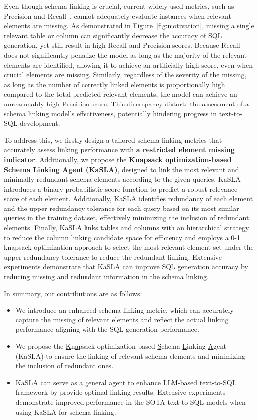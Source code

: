 Even though schema linking is crucial, current widely used metrics, such as Precision and Recall~\citep{li2023resdsql,li2024codes,qu2024before}, cannot adequately evaluate instances when relevant elements are missing. As demonstrated in Figure~\ref{fig:motivation}, missing a single relevant table or column can significantly decrease the accuracy of SQL generation, yet still result in high Recall and Precision scores. Because Recall does not significantly penalize the model as long as the majority of the relevant elements are identified, allowing it to achieve an artificially high score, even when crucial elements are missing.
Similarly, regardless of the severity of the missing, as long as the number of correctly linked elements is proportionally high compared to the total predicted relevant elements, the model can achieve an unreasonably high Precision score. This discrepancy distorts the assessment of a schema linking model’s effectiveness, potentially hindering progress in text-to-SQL development.

To address this, we firstly design a tailored schema linking metrics that accurately assess linking performance with \textbf{a restricted element missing indicator}.
Additionally, we propose the \textbf{\underline{K}n\underline{a}psack optimization-based \underline{S}chema \underline{L}inking \underline{A}gent (KaSLA)}, designed to link the most relevant and minimally redundant schema elements according to the given queries.
KaSLA introduces a binary-probabilistic score function to predict a robust relevance score of each element. Additionally, KaSLA identifies redundancy of each element and the upper redundancy tolerance for each query based on its most similar queries in the training dataset, effectively minimizing the inclusion of redundant elements.
Finally, KaSLA links tables and columns with an hierarchical strategy to reduce the column linking candidate space for efficiency and employs a 0-1 knapsack optimization approach to select the most relevant element set under the upper redundancy tolerance to reduce the redundant linking. Extensive experiments demonstrate that KaSLA can improve SQL generation accuracy by reducing missing and redundant information in the schema linking.

In summary, our contributions are as follows:
\begin{itemize}[leftmargin=2em]
\item We introduce an enhanced schema linking metric, which can accurately capture the missing of relevant elements and reflect the actual linking performance aligning with the SQL generation performance.
\item We propose the \underline{K}n\underline{a}psack optimization-based \underline{S}chema \underline{L}inking \underline{A}gent (KaSLA) to ensure the linking of relevant schema elements and minimizing the inclusion of redundant ones.
\item KaSLA can serve as a general agent to enhance LLM-based text-to-SQL framework by provide optimal linking results. Extensive experiments demonstrate improved performance in the SOTA text-to-SQL models when using KaSLA for schema linking.
\end{itemize}
